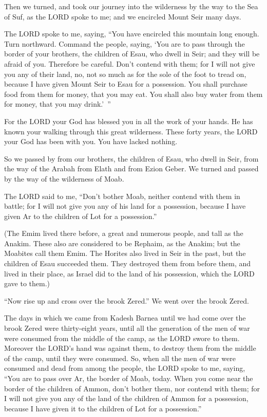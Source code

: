 \mychapter{} \myverse*{}Then we turned, and took our journey into the wilderness by the
way to the Sea of Suf, as the LORD spoke to me; and we encircled Mount Seir many days.


\myverse{}The LORD spoke to me, saying,
\myverse{}“You have encircled this mountain long enough. Turn northward.
\myverse{}Command the people, saying, ‘You are to pass through the border of your brothers,
the children of Esau, who dwell in Seir; and they will be afraid of you. Therefore be careful.
\myverse{}Don’t contend with them; for I will not give you any of their land, no, not
so much as for the sole of the foot to tread on, because I have given Mount Seir to Esau for a possession.
\myverse{}You shall purchase food from them for money, that you may eat. You shall also
buy water from them for money, that you may drink.’ ”


\myverse{}For the LORD your God has blessed you in all the work of your hands.
He has known your walking through this great wilderness. These forty years, the LORD your God has been
with you. You have lacked nothing.


\myverse{}So we passed by from our brothers, the children of Esau, who dwell
in Seir, from the way of the Arabah from Elath and from Ezion Geber. We turned and passed by the way of
the wilderness of Moab.


\myverse{}The LORD said to me, “Don’t bother Moab, neither contend with them
in battle; for I will not give you any of his land for a possession, because I have given Ar to the children
of Lot for a possession.”


\myverse{}(The Emim lived there before, a great and numerous people, and
tall as the Anakim.
\myverse{}These also are considered to be Rephaim, as the Anakim; but the Moabites call
them Emim.
\myverse{}The Horites also lived in Seir in the past, but the children of Esau succeeded
them. They destroyed them from before them, and lived in their place, as Israel did to the land of his
possession, which the LORD gave to them.)


\myverse{}“Now rise up and cross over the brook Zered.” We went over the
brook Zered.


\myverse{}The days in which we came from Kadesh Barnea until we had come
over the brook Zered were thirty-eight years, until all the generation of the men of war were consumed
from the middle of the camp, as the LORD swore to them.
\myverse{}Moreover the LORD’s hand was against them, to destroy them from the middle
of the camp, until they were consumed.
\myverse{}So, when all the men of war were consumed and dead from among the people,
\myverse{}the LORD spoke to me, saying,
\myverse{}“You are to pass over Ar, the border of Moab, today.
\myverse{}When you come near the border of the children of Ammon, don’t bother them,
nor contend with them; for I will not give you any of the land of the children of Ammon for a possession,
because I have given it to the children of Lot for a possession.”


